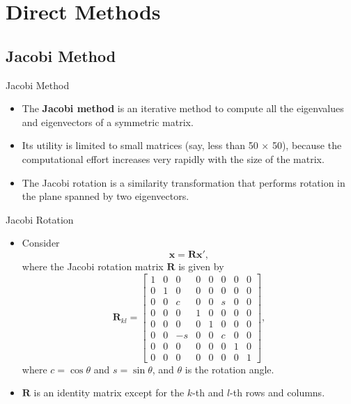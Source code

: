 \documentclass{beamer}
\begin{document}
\section{Direct Methods}
\subsection{Jacobi Method}
\begin{frame}{Jacobi Method}
\begin{itemize}
\item The \textbf{Jacobi method} is an iterative method to compute all the eigenvalues and eigenvectors of a symmetric matrix.
\item Its utility is limited to small matrices (say, less than 50 $\times$ 50), because the computational effort increases very rapidly with
the size of the matrix. 
\item The Jacobi rotation is a similarity transformation that performs rotation in the plane spanned by two eigenvectors.

\end{itemize}
\end{frame}
\begin{frame}{Jacobi Rotation}
\begin{itemize}
\item Consider 
\[
\mathbf{x}=\mathbf{R} \mathbf{x}',
\]
where the Jacobi rotation matrix $\mathbf{R}$ is given by
\[
\mathbf{R}_{kl}=\left[\begin{array}{cccccccc}
    1 & 0 & 0 & 0 & 0 & 0 & 0 & 0 \\
    0 & 1 & 0 & 0 & 0 & 0 & 0 & 0 \\
    0 & 0 & c & 0 & 0 & s & 0 & 0 \\
    0 & 0 & 0 & 1 & 0 & 0 & 0 & 0 \\
    0 & 0 & 0 & 0 & 1 & 0 & 0 & 0 \\
    0 & 0 & -s & 0 & 0 & c & 0 & 0 \\
    0 & 0 & 0 & 0 & 0 & 0 & 1 & 0 \\
    0 & 0 & 0 & 0 & 0 & 0 & 0 & 1
    \end{array}\right],
\]
where  $c=\cos \theta$ and $s=\sin \theta$, and $\theta$ is the rotation angle.
\item $\mathbf{R}$ is an identity matrix except for the $k$-th and $l$-th rows and columns.

\end{itemize}
\end{frame}
\end{document}
